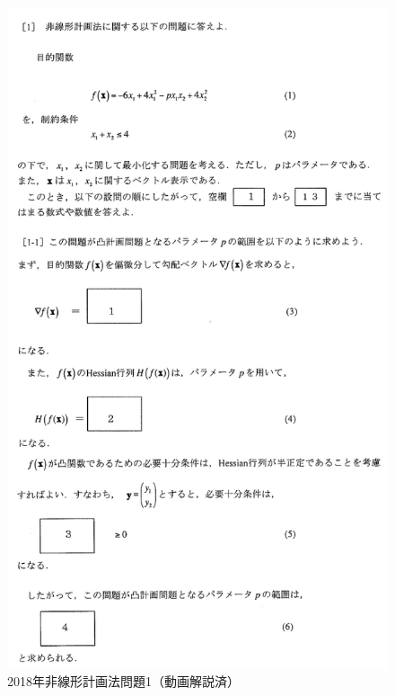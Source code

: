 \documentclass{jsarticle}
\begin{document}
\begin{figure}[htbp]
  \includegraphics[keepaspectratio, width=14cm]{figures/nonliner2018.png}
  \caption{2018年非線形計画法問題1（動画解説済）\label{nonliner20181}}
\end{figure}
\end{document}
